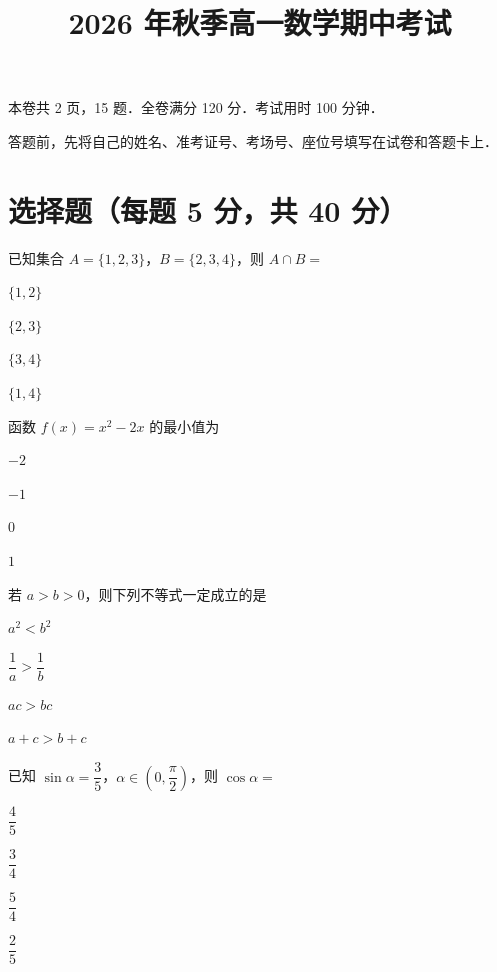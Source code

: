 \documentclass{exam-zh}
\title{2026 年秋季高一数学期中考试}
\begin{document}
\maketitle
\begin{notice}
\item 本卷共 2 页，15 题．全卷满分 120 分．考试用时 100 分钟．
\item 答题前，先将自己的姓名、准考证号、考场号、座位号填写在试卷和答题卡上．
\end{notice}

\section{选择题（每题 5 分，共 40 分）}
\begin{question}
已知集合 $A=\{1,2,3\}$，$B=\{2,3,4\}$，则 $A\cap B=$ \paren
\begin{choices}
\item $\{1,2\}$
\item $\{2,3\}$
\item $\{3,4\}$
\item $\{1,4\}$
\end{choices}
\end{question}
\begin{question}
函数 $f(x)=x^2-2x$ 的最小值为 \paren
\begin{choices}
\item $-2$
\item $-1$
\item $0$
\item $1$
\end{choices}
\end{question}
\begin{question}
若 $a>b>0$，则下列不等式一定成立的是 \paren
\begin{choices}
\item $a^2<b^2$
\item $\dfrac{1}{a}>\dfrac{1}{b}$
\item $ac>bc$
\item $a+c>b+c$
\end{choices}
\end{question}
\begin{question}
已知 $\sin\alpha=\dfrac{3}{5}$，$\alpha\in\left(0,\dfrac{\pi}{2}\right)$，则 $\cos\alpha=$ \paren
\begin{choices}
\item $\dfrac{4}{5}$
\item $\dfrac{3}{4}$
\item $\dfrac{5}{4}$
\item $\dfrac{2}{5}$
\end{choices}
\end{question}
\end{document}

